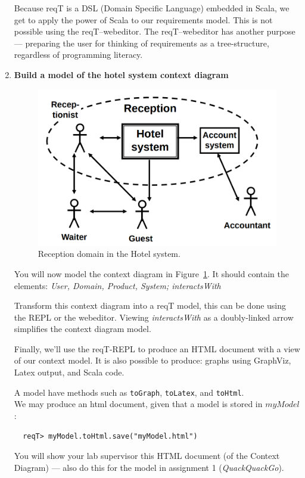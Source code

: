 \documentclass[11pt]{article}
\begin{document}
\begin{enumerate}
Because reqT is a DSL (Domain Specific Language) embedded in Scala, we get to apply the power of Scala to our requirements model. This is not possible using the reqT--webeditor. The reqT--webeditor has another purpose --- preparing the user for thinking of requirements as a tree-structure, regardless of programming literacy.

%
%
\item \textbf{Build a model of the hotel system context diagram}

\begin{figure}[H]
  \centering
  \includegraphics[width=\textwidth]{context-diagram.png}
  \caption{Reception domain in the Hotel system.}
  \label{figure:receptionDomainContextDiagram}
\end{figure}

You will now model the context diagram in Figure~\ref{figure:receptionDomainContextDiagram}. It should contain the elements: \textit{User, Domain, Product, System; interactsWith}

Transform this context diagram into a reqT model, this can be done using the REPL or the webeditor. Viewing \textit{interactsWith} as a doubly-linked arrow simplifies the context diagram model.

Finally, we'll use the reqT-REPL to produce an HTML document with a view of our context model. It is also possible to produce: graphs using GraphViz, Latex output, and Scala code.

\begin{framed}
\noindent A model have methods such as \texttt{toGraph}, \texttt{toLatex}, and \texttt{toHtml}.\\
\noindent We may produce an html document, given that a model is stored in $myModel$:
{
  \footnotesize\begin{verbatim}
  reqT> myModel.toHtml.save("myModel.html")
  \end{verbatim}
}
\noindent You will show your lab supervisor this HTML document (of the Context Diagram) --- also do this for the model in assignment 1 (\textit{QuackQuackGo}).


\end{framed}
\end{enumerate}
\end{document}
